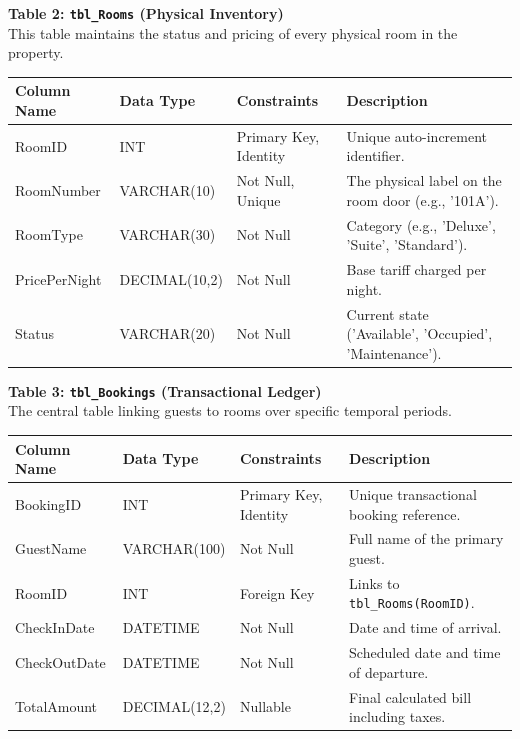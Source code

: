 \documentclass[12pt,a4paper]{article}
\begin{document}
\textbf{Table 2: \texttt{tbl\_Rooms} (Physical Inventory)} \\
This table maintains the status and pricing of every physical room in the property.
\begin{table}[H]
\centering
\begin{tabularx}{\textwidth}{|l|l|l|X|}
\hline
\textbf{Column Name} & \textbf{Data Type} & \textbf{Constraints} & \textbf{Description} \\
\hline
RoomID & INT & Primary Key, Identity & Unique auto-increment identifier. \\
\hline
RoomNumber & VARCHAR(10) & Not Null, Unique & The physical label on the room door (e.g., '101A'). \\
\hline
RoomType & VARCHAR(30) & Not Null & Category (e.g., 'Deluxe', 'Suite', 'Standard'). \\
\hline
PricePerNight & DECIMAL(10,2) & Not Null & Base tariff charged per night. \\
\hline
Status & VARCHAR(20) & Not Null & Current state ('Available', 'Occupied', 'Maintenance'). \\
\hline
\end{tabularx}
\end{table}

\textbf{Table 3: \texttt{tbl\_Bookings} (Transactional Ledger)} \\
The central table linking guests to rooms over specific temporal periods.
\begin{table}[H]
\centering
\begin{tabularx}{\textwidth}{|l|l|l|X|}
\hline
\textbf{Column Name} & \textbf{Data Type} & \textbf{Constraints} & \textbf{Description} \\
\hline
BookingID & INT & Primary Key, Identity & Unique transactional booking reference. \\
\hline
GuestName & VARCHAR(100) & Not Null & Full name of the primary guest. \\
\hline
RoomID & INT & Foreign Key & Links to \texttt{tbl\_Rooms(RoomID)}. \\
\hline
CheckInDate & DATETIME & Not Null & Date and time of arrival. \\
\hline
CheckOutDate & DATETIME & Not Null & Scheduled date and time of departure. \\
\hline
TotalAmount & DECIMAL(12,2) & Nullable & Final calculated bill including taxes. \\
\hline
\end{tabularx}
\end{table}
\end{document}
